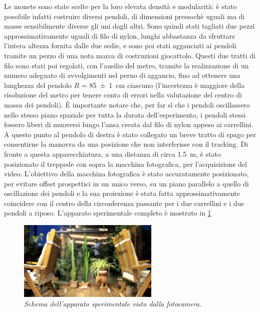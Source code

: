 \documentclass[11pt, a4paper, twoside, italian]{article}
\begin{document}
Le monete sono state scelte per la loro elevata densità e modularità: è 
stato possibile infatti costruire diversi pendoli, di dimensioni pressochè
uguali ma di masse sensibilmente diverse gli uni dagli altri.
Sono quindi stati tagliati due pezzi approssimativamente
uguali di filo di nylon, lunghi abbastanza da sfruttare l'intera altezza 
fornita dalle due sedie, e sono poi stati agganciati ai pendoli tramite un pezzo di una nota 
marca di costruzioni giocattolo. Questi due tratti di filo sono stati poi regolati,
con l'ausilio del metro,
tramite la realizzazione di un numero adeguato di avvolgimenti nel perno di 
aggancio, fino ad ottenere una lunghezza del pendolo $R$ = \SI{85 \pm 1}{\centi\m} ciascuno (l'incertezza è 
maggiore della risoluzione del metro per tenere conto di errori nella valutazione del centro
di massa dei pendoli).
È importante notare che, per far sì che i pendoli oscillassero nello stesso piano
spaziale per tutta la durata dell'esperimento, i pendoli stessi fossero
liberi di muoversi lungo l'ansa creata dal filo di nylon appeso ai carrellini. 
A questo punto al pendolo di destra è stato collegato un breve tratto di spago 
per consentirne la manovra da una posizione che non interferisse con il tracking.
Di fronte a questa apparecchiatura, a una distanza di circa \SI{1.5}{\m}, è stato 
posizionato il treppede con sopra la macchina fotografica, per l'acquisizione
del video.
L'obiettivo della macchina fotografica è stato accuratamente posizionato, per evitare
offset prospettici in un unico verso, su un piano parallelo a quello di oscillazione dei
pendoli e la sua proiezione è stata fatta approssimativamente coincidere con il
centro della circonferenza passante per i due carrellini e i due pendoli a 
riposo.
L'apparato sperimentale completo è mostrato in \cref{setup_exp}

\begin{figure}[h!]
  \centering
  \includegraphics[width=0.6\textwidth]{../../media/img/setup_exp.png}
  \caption{\textit{Schema dell'apparato sperimentale visto dalla fotocamera.}}
  \label{setup_exp}
\end{figure}
\end{document}
